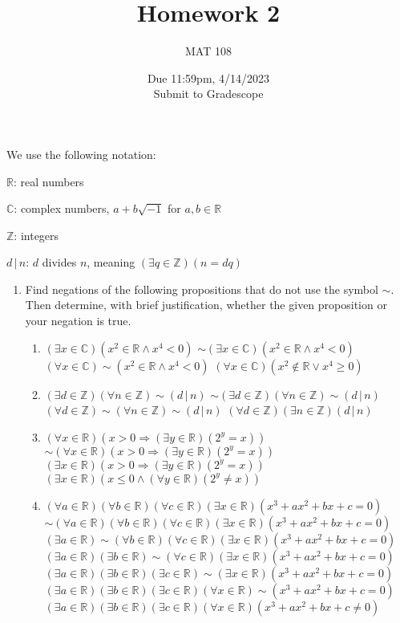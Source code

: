 \documentclass{article}
\title{Homework 2}
\author{MAT 108}
\date{Due 11:59pm, 4/14/2023\\
\vspace{0.1cm}
Submit to Gradescope}
\newcommand{\bR}{\mathbb{R}}
\newcommand{\bC}{\mathbb{C}}
\newcommand{\bZ}{\mathbb{Z}}
\begin{document}
\maketitle
{\large
\noindent We use the following notation:
\begin{description}[itemsep=0em]
\item $\bR$: real numbers
\item $\bC$: complex numbers, $a+b\sqrt{-1}$ for $a,b\in\bR$
\item $\bZ$: integers
\item $d\,|\,n$: $d$ divides $n$, meaning $(\exists
q\in\bZ)(n=dq)$
\end{description}
\begin{enumerate}[labelindent=0pt,leftmargin=0pt]
\setlength{\itemsep}{13pt}
\item Find negations of the following propositions that do not use the
symbol $\sim$. Then determine, with brief justification, whether the given
proposition or your negation is true.\begin{enumerate}

\item $(\exists x\in\bC)(x^2\in\bR\land x^4 < 0)$
\subitem $\sim\!(\exists x\in\bC)(x^2\in\bR\land x^4 < 0)$
\subitem $(\forall x\in\bC)\sim\!(x^2\in\bR\land x^4 < 0)$
\subitem $(\forall x\in\bC)(x^2\notin\bR\lor x^4 \geq 0)$

\item $(\exists d\in\bZ)(\forall n\in \bZ)\sim\!(d\,|\,n)$
\subitem $\sim\!(\exists d\in\bZ)(\forall n\in \bZ)\sim\!(d\,|\,n)$
\subitem $(\forall d\in\bZ)\sim\!(\forall n\in \bZ)\sim\!(d\,|\,n)$
\subitem $(\forall d\in\bZ)(\exists n\in \bZ)(d\,|\,n)$

\item $(\forall x\in\bR)(x>0\Rightarrow(\exists y\in\bR)(2^y=x))$
\subitem $\sim\!(\forall x\in\bR)(x>0\Rightarrow(\exists y\in\bR)(2^y=x))$
\subitem $(\exists x\in\bR)(x>0\Rightarrow(\exists y\in\bR)(2^y=x))$
\subitem $(\exists x\in\bR)(x\leq0\land(\forall y\in\bR)(2^y \neq x))$

\item $(\forall a\in\bR)(\forall b\in\bR)(\forall c\in\bR)(\exists
x\in\bR)(x^3+ax^2+bx+c=0)$
\subitem $\sim\!(\forall a\in\bR)(\forall b\in\bR)(\forall c\in\bR)(\exists
x\in\bR)(x^3+ax^2+bx+c=0)$
\subitem $(\exists a\in\bR)\sim\!(\forall b\in\bR)(\forall c\in\bR)(\exists
x\in\bR)(x^3+ax^2+bx+c=0)$
\subitem $(\exists a\in\bR)(\exists b\in\bR)\sim\!(\forall c\in\bR)(\exists
x\in\bR)(x^3+ax^2+bx+c=0)$
\subitem $(\exists a\in\bR)(\exists b\in\bR)(\exists c\in\bR)\sim\!(\exists
x\in\bR)(x^3+ax^2+bx+c=0)$
\subitem $(\exists a\in\bR)(\exists b\in\bR)(\exists c\in\bR)(\forall
x\in\bR)\sim\!(x^3+ax^2+bx+c=0)$
\subitem $(\exists a\in\bR)(\exists b\in\bR)(\exists c\in\bR)(\forall
x\in\bR)(x^3+ax^2+bx+c \neq 0)$


\end{enumerate}
\end{enumerate}}
\end{document}
